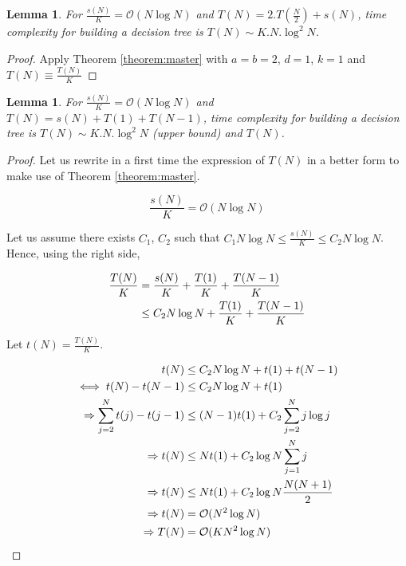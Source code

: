 \documentclass[english,11pt,openany]{report}
\theoremstyle{definition}
\newcommand{\bigO}{\mathcal{O}}
\theoremstyle{plain}
\newtheorem{Lemma}[Th]{Lemma}
\theoremstyle{definition}
\begin{document}
\begin{appendices}
\vspace{0.5cm}
\begin{Lemma}
	For $\frac{s(N)}{K} = \mathcal{O} (N\log N)$ and $T(N) = 2.T(\frac{N}{2}) + s(N)$, 
	time complexity for building a decision tree is $T(N) \sim K.N.\log^2N$.
\end{Lemma}

\begin{proof}
	Apply Theorem \ref{theorem:master} with $a=b=2$, $d=1$, $k=1$ and $T(N) \equiv \frac{T(N)}{K}$
\end{proof}


\begin{Lemma}
	For $\frac{s(N)}{K} = \mathcal{O} (N\log N)$ and $T(N) = s(N) + T(1) + T(N - 1) $, time complexity for building a decision tree is $T(N) \sim K.N.\log^2N$ (upper bound) and $T(N) $.
\end{Lemma}

\begin{proof}
	Let us rewrite in a first time the expression of $T(N)$ in a better form to make use of Theorem \ref{theorem:master}. 
	
	\begin{displaymath}
	\frac{s(N)}{K} = \mathcal{O} (N\log N)
	\end{displaymath}
	
	Let us assume there exists $C_1$, $C_2$ such that $C_1 N\log N \leq \frac{s(N)}{K} \leq C_2 N\log N$. 
	Hence, using the right side, 
	
	\begin{align}
	\frac{T(N)}{K}	& = \frac{s(N)}{K} + \frac{T(1)}{K} + \frac{T(N - 1)}{K} \notag \\
					& \leq C_2 N\log N + \frac{T(1)}{K} + \frac{T(N - 1)}{K}\notag
	\end{align}
	
	Let $t(N) = \frac{T(N)}{K}$. 
	
	\begin{align}
	t(N) &\leq C_2 N\log N + t(1) + t(N-1)\notag \\
	\iff  t(N) - t(N-1) &\leq C_2 N\log N + t(1) \notag\\
	\Rightarrow  \sum_{j=2}^{N}  t(j) - t(j-1) &\leq (N-1)t(1) + C_2\sum_{j=2}^{N}j \log j \notag\\
	\Rightarrow  t(N) &\leq Nt(1) + C_2\log N \sum_{j=1}^{N}j \notag\\
	\Rightarrow  t(N) &\leq Nt(1) + C_2\log N \frac{N(N +1)}{2}\notag \\
	\Rightarrow  t(N) &= \bigO (N^2 \log N) \notag \\
	\Rightarrow  T(N) &= \bigO (KN^2 \log N) \notag
	\end{align}
	

\end{proof}
\end{appendices}
\end{document}
